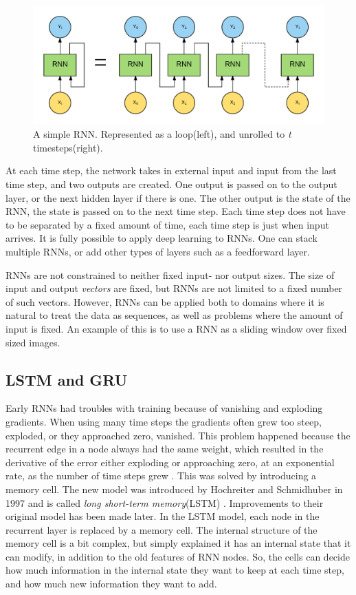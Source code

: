 \begin{figure}[htp]
	\centering
	\includegraphics[width=1.0\textwidth]{fig/rnn.png}
	\caption{A simple RNN. Represented as a loop(left), and unrolled to \textit{t} timesteps(right).}
	\label{fig:rnn}
\end{figure}

At each time step, the network takes in external input and input from the last time step, and two outputs are created. One output is passed on to the output layer, or the next hidden layer if there is one. The other output is the state of the RNN, the state is passed on to the next time step. Each time step does not have to be separated by a fixed amount of time, each time step is just when input arrives. It is fully possible to apply deep learning to RNNs. One can stack multiple RNNs, or add other types of layers such as a feedforward layer.

RNNs are not constrained to neither fixed input- nor output sizes. The size of input and output \textit{vectors} are fixed, but RNNs are not limited to a fixed number of such vectors. However, RNNs can be applied both to domains where it is natural to treat the data as sequences, as well as problems where the amount of input is fixed. An example of this is to use a RNN as a sliding window over fixed sized images.


\subsection{LSTM and GRU}
Early RNNs had troubles with training because of vanishing and exploding gradients. When using many time steps the gradients often grew too steep, exploded, or they approached zero, vanished. This problem happened because the recurrent edge in a node always had the same weight, which resulted in the derivative of the error either exploding or approaching zero, at an exponential rate, as the number of time steps grew \cite{DBLP:journals/corr/Lipton15}. This was solved by introducing a memory cell. The new model was introduced by Hochreiter and Schmidhuber in 1997 and is called \textit{long short-term memory}(LSTM) \cite{Hochreiter96bridginglong}. Improvements to their original model has been made later. In the LSTM model, each node in the recurrent layer is replaced by a memory cell. The internal structure of the memory cell is a bit complex, but simply explained it has an internal state that it can modify, in addition to the old features of RNN nodes. So, the cells can decide how much information in the internal state they want to keep at each time step, and how much new information they want to add.

